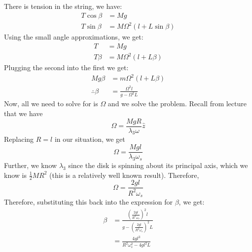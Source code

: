 \documentclass[10pt]{article}
\begin{document}
	
	\begin{solution}
		There is tension in the string, we have: 
		\begin{align*}
			T \cos \beta &= Mg  \\
			T \sin \beta &= M\Omega^2 (l + L \sin \beta)
		\end{align*}
		Using the small angle approximations, we get:
		\begin{align*}
			T &= Mg \\
			T \beta &= M\Omega^2(l + L\beta)
		\end{align*}
		Plugging the second into the first we get:
		\begin{align*}
			Mg\beta &= m\Omega^2 (l + L\beta) \\
			\therefore \beta &= \frac{\Omega^2 l}{g - \Omega^2 L}	
		\end{align*}
		Now, all we need to solve for is $\Omega$ and we solve the problem. Recall from lecture that we have
		\[
		\Omega = \frac{MgR}{\lambda_3 \omega}\hat{z}
		\] 
		Replacing $R = l$ in our situation, we get 
		\[
			\Omega = \frac{Mgl}{\lambda_3 \omega_s}
		\]
		Further, we know $\lambda_3$ since the disk is spinning about its
		principal axis, which we know is $\frac{1}{2}MR^2$ (this is a
		relatively well known result). Therefore, 
		\[
		\Omega = \frac{2gl}{R^2 \omega_s}
		\] 
		Therefore, substituting this back into the expression for $\beta$, we get:
		\begin{align*}
			\beta &= \frac{\left( \frac{2gl}{R^2 \omega_s} \right)^2 l}{g - \left( \frac{2gl}{R^2 \omega_s}
			\right)^2 L} \\
			&= \frac{4gl^3}{R^2 \omega_s^2 - 4gl^2L}
		\end{align*}
	\end{solution}
\end{document}
